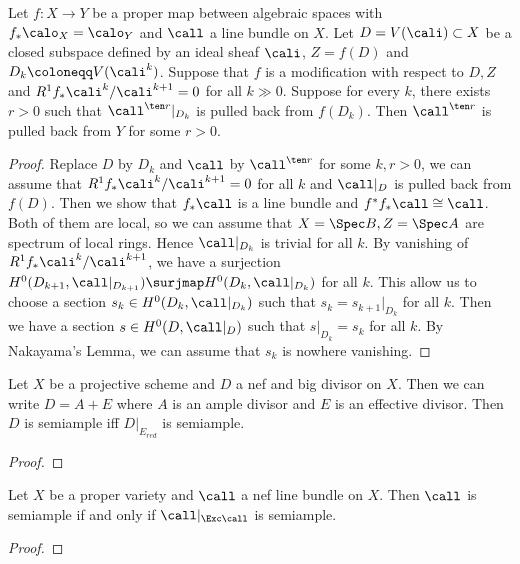     \begin{lemma}
        Let \(f:X \to Y\) be a proper map between algebraic spaces with \(f_*\calo_X = \calo_Y\) and \(\call\) a line bundle on \(X\).
        Let \(D = V(\cali) \subset X\) be a closed subspace defined by an ideal sheaf \(\cali\), \(Z = f(D)\) and \(D_k \coloneqq V(\cali^k)\).
        Suppose that \(f\) is a modification with respect to \(D,Z\) and \(R^1f_*\cali^k/\cali^{k+1} = 0\) for all \(k \gg 0\).
        Suppose for every \(k\), there exists \(r>0\) such that \(\call^{\ten r}|_{D_k}\) is pulled back from \(f(D_k)\).
        Then \(\call^{\ten r}\) is pulled back from \(Y\) for some \(r>0\).
    \end{lemma}
    \begin{proof}
        Replace \(D\) by \(D_k\) and \(\call\) by \(\call^{\ten r}\) for some \(k,r>0\), we can assume that \(R^1f_*\cali^k/\cali^{k+1} = 0\) for all \(k\) and \(\call|_D\) is pulled back from \(f(D)\).
        Then we show that \(f_*\call\) is a line bundle and \(f^*f_*\call \cong \call\).
        Both of them are local, so we can assume that \(X = \Spec B,Z=\Spec A\) are spectrum of local rings.
        Hence \(\call|_{D_k}\) is trivial for all \(k\).
        By vanishing of \(R^1f_*\cali^k/\cali^{k+1}\), we have a surjection \(H^0(D_{k+1}, \call|_{D_{k+1}}) \surjmap H^0(D_k, \call|_{D_k})\) for all \(k\).
        This allow us to choose a section \(s_k \in H^0(D_k, \call|_{D_k})\) such that \(s_k = s_{k+1}|_{D_k}\) for all \(k\).
        Then we have a section \(s \in H^0(D, \call|_D)\) such that \(s|_{D_k} = s_k\) for all \(k\).
        By Nakayama's Lemma, we can assume that \(s_k\) is nowhere vanishing.
    \end{proof}

    \begin{proposition}\label{prop:semiample_nef_big_iff_effective_locus_char_p}
        Let \(X\) be a projective scheme and \(D\) a nef and big divisor on \(X\).
        Then we can write \(D = A + E\) where \(A\) is an ample divisor and \(E\) is an effective divisor.
        Then \(D\) is semiample iff \(D|_{E_{red}}\) is semiample.
    \end{proposition}
    \begin{proof}
    \end{proof}

    \begin{theorem}\label{thm:semiample_iff_semiample_on_exceptional_locus}
        Let \(X\) be a proper variety and \(\call\) a nef line bundle on \(X\).
        Then \(\call\) is semiample if and only if \(\call|_{\Exc \call}\) is semiample.
    \end{theorem}
    \begin{proof}
    \end{proof}


